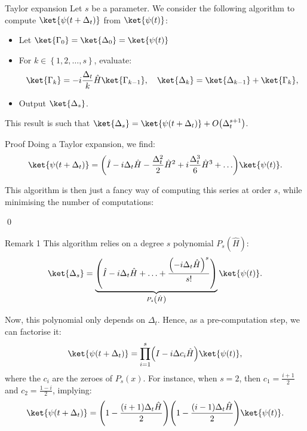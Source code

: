 \documentclass[a4paper]{article}
\begin{document}
\begin{parag}{Taylor expansion}
    Let $s$ be a parameter. We consider the following algorithm to compute $\ket{\psi\left(t + \Delta_t\right)}$ from $\ket{\psi\left(t\right)}$:
    \begin{itemize}
        \item Let $\ket{\Gamma_0} = \ket{\Delta_0} = \ket{\psi\left(t\right)}$
        \item For $k \in \left\{1, 2, \ldots, s\right\}$, evaluate:
        \[\ket{\Gamma_k} = -i\frac{\Delta_t}{k} \hat{H} \ket{\Gamma_{k-1}}, \mathspace \ket{\Delta_k} = \ket{\Delta_{k-1}} + \ket{\Gamma_k},\]
        \item Output $\ket{\Delta_s}$.
    \end{itemize}

    This result is such that $\ket{\Delta_s} = \ket{\psi\left(t + \Delta_t\right)} + O\left(\Delta_t^{s+1}\right)$.
    
    \begin{subparag}{Proof}
        Doing a Taylor expansion, we find:
        \[\ket{\psi\left(t + \Delta_t\right)} = \left(\hat{I} - i \Delta_t \hat{H} - \frac{\Delta_t^2}{2} \hat{H}^2 + i \frac{\Delta_t^3}{6} \hat{H}^3 + \ldots\right) \ket{\psi\left(t\right)}.\]

        This algorithm is then just a fancy way of computing this series at order $s$, while minimising the number of computations: 

        \qed
    \end{subparag}

    \begin{subparag}{Remark 1}
        This algorithm relies on a degree $s$ polynomial $P_s\left(\hat{H}\right)$: 
        \[\ket{\Delta_s} = \underbrace{\left(\hat{I} - i \Delta_t \hat{H} + \ldots + \frac{\left(-i \Delta_t \hat{H}\right)^s}{s!}\right)}_{P_s\left(\hat{H}\right)}\ket{\psi\left(t\right)}.\]

        Now, this polynomial only depends on $\Delta_t$. Hence, as a pre-computation step, we can factorise it:
        \[\ket{\psi\left(t + \Delta_t\right)} = \prod_{i=1}^{s} \left(I - i \Delta c_i \hat{H}\right) \ket{\psi\left(t\right)},\]
        where the $c_i$ are the zeroes of $P_s\left(x\right)$. For instance, when $s = 2$, then $c_1 = \frac{i+1}{2}$ and $c_2 = \frac{1-i}{2}$, implying: 
        \[\ket{\psi\left(t + \Delta_t\right)} = \left(1 - \frac{\left(i+1\right) \Delta_t \hat{H}}{2}\right)\left(1 - \frac{\left(i-1\right)\Delta_t \hat{H}}{2}\right) \ket{\psi\left(t\right)}.\]


\end{subparag}
\end{parag}
\end{document}

